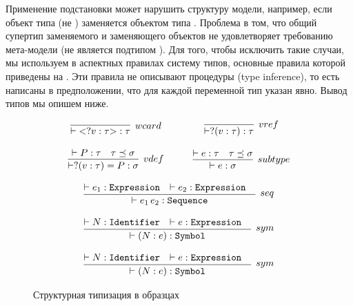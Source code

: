 Применение подстановки может нарушить структуру модели, например, если объект типа  (не ) заменяется объектом типа . Проблема в том, что общий супертип заменяемого и заменяющего объектов не удовлетворяет требованию мета-модели (не является подтипом ). Для того, чтобы исключить такие случаи, мы используем в аспектных правилах систему типов, основные правила которой приведены на . Эти правила не описывают процедуры  (type inference), то есть написаны в предположении, что для каждой переменной тип указан явно. Вывод типов мы опишем ниже.
\begin{figure}[htbp]
	\centering
$$
\begin{array}{ccc}
	\infer[wcard]{ \vdash \wcard{?v}{\tau} : \tau}{}
	&\quad&
	\infer[vref]{ \vdash ?(v : \tau) : \tau}{}\\
	&&\,\\
	\infer[vdef]{ \vdash ?(v : \tau) = P : \sigma}{
		 \vdash P : \tau & \tau \preceq \sigma	
	}
	&&
	\infer[subtype]{ \vdash e : \sigma}{
		 \vdash e : \tau & \tau \preceq \sigma	
	}\\
	&&\,\\
	\multicolumn{3}{c}{
	\infer[seq]{ \vdash e_1 \, e_2 : \mathtt{Sequence}}{
		 \vdash e_1 : \mathtt{Expression} & 
		 \vdash e_2 : \mathtt{Expression} & 
	}}\\
	&&\,\\
	\multicolumn{3}{c}{
	\infer[sym]{ \vdash (N : e) : \mathtt{Symbol}}{
		 \vdash N : \mathtt{Identifier} & 
		 \vdash e : \mathtt{Expression} & 
	}}\\
	\,\\
	\multicolumn{3}{c}{
	\infer[sym]{ \vdash (N : e) : \mathtt{Symbol}}{
		 \vdash N : \mathtt{Identifier} & 
		 \vdash e : \mathtt{Expression} & 
	}}\\
\end{array}
$$
	\caption{Структурная типизация в образцах}\label{AspTypes}
\end{figure}

